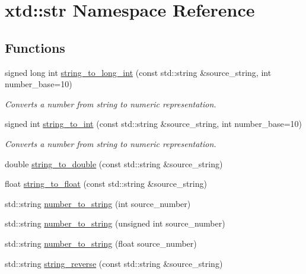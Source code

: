 \hypertarget{namespacextd_1_1str}{\section{xtd\-:\-:str Namespace Reference}
\label{namespacextd_1_1str}
}
\subsection*{Functions}
\begin{DoxyCompactItemize}
\item 
signed long int \hyperlink{namespacextd_1_1str_a0dce7c929afcd50ffbdb542a5aeaf37a}{string\-\_\-to\-\_\-long\-\_\-int} (const std\-::string \&source\-\_\-string, int number\-\_\-base=10)
\begin{DoxyCompactList}\small\item\em Converts a number from string to numeric representation. \end{DoxyCompactList}\item 
signed int \hyperlink{namespacextd_1_1str_a4c8c7aa55d1f5637474424b9abab6467}{string\-\_\-to\-\_\-int} (const std\-::string \&source\-\_\-string, int number\-\_\-base=10)
\begin{DoxyCompactList}\small\item\em Converts a number from string to numeric representation. \end{DoxyCompactList}\item 
double \hyperlink{namespacextd_1_1str_aaabc2e3834d3052e392cda6140ae5cc2}{string\-\_\-to\-\_\-double} (const std\-::string \&source\-\_\-string)
\item 
float \hyperlink{namespacextd_1_1str_a90f49ec1f4ff29fd05d598f815f9b4e0}{string\-\_\-to\-\_\-float} (const std\-::string \&source\-\_\-string)
\item 
std\-::string \hyperlink{namespacextd_1_1str_a84c0f8285134f075fde7fbb91ee174ef}{number\-\_\-to\-\_\-string} (int source\-\_\-number)
\item 
std\-::string \hyperlink{namespacextd_1_1str_a485b63dcd6cac4d8b45712f634a2aaed}{number\-\_\-to\-\_\-string} (unsigned int source\-\_\-number)
\item 
std\-::string \hyperlink{namespacextd_1_1str_ae520ea89838af34abca58612baf0ee7d}{number\-\_\-to\-\_\-string} (float source\-\_\-number)
\item 
std\-::string \hyperlink{namespacextd_1_1str_a0e5d3ce0842d8c4a0b42ec6bba6c5b00}{string\-\_\-reverse} (const std\-::string \&source\-\_\-string)
\item 

\end{DoxyCompactItemize}
